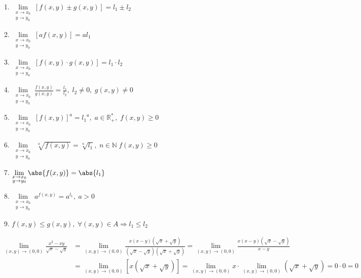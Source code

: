 \documentclass[a4paper,11pt]{report}
\begin{document}
\begin{mybox2}
\begin{thm}
    \begin{minipage}[t]{0.5\textwidth}
      \begin{enumerate}
        \item $ \lim\limits_{\substack{x\to x_{0} \\y \to y_{0}}}  [f(x,y)\pm g(x,y)] = 
          l_{1}\pm l_{2} $ 
        \item $ \lim\limits_{\substack{x\to x_{0} \\y \to y_{0}}}  [a f(x,y)] = al_{1} $
        \item $ \lim\limits_{\substack{x\to x_{0} \\y \to y_{0}}}  [f(x,y)\cdot g(x,y)] = 
          l_{1}\cdot l_{2} $
        \item $ \lim\limits_{\substack{x\to x_{0} \\y \to y_{0}}}  \frac{f(x,y)}{g(x,y)} = 
          \frac{l_{1}}{l_{2}}, \; l_{2} \neq 0, \; g(x,y) \neq 0 $
        \item $ \lim\limits_{\substack{x\to x_{0} \\y \to y_{0}}}  [f(x,y)]^{a} = 
          {l_{1}}^{a}, \; a \in \mathbb{R}^{*}_{+}, \; f(x,y) \geq 0 $
        \item $ \lim\limits_{\substack{x\to x_{0} \\y \to y_{0}}}  \ \sqrt[n]{f(x,y)} =
          \sqrt[n]{l_{1}}, \; n \in \mathbb{N} \; f(x,y) \geq 0  $
      \end{enumerate}
    \end{minipage} \hfill 
    \begin{minipage}[t]{0.49\textwidth}
      \begin{enumerate}
        \setcounter{enumi}{6}
        \item $ \lim\limits_{\substack{x\to x_{0} \\y \to y_{0}}}  \abs{f(x,y)} = 
          \abs{l_{1}} $ 
        \item $ \lim\limits_{\substack{x\to x_{0} \\y \to y_{0}}} a^{f(x,y)} = 
          a^{l_{1}}, \; a >0 $
        \item $ f(x,y) \leq g(x,y), \; \forall (x,y) \in A \Rightarrow l_{1} \leq l_{2} $
      \end{enumerate}
    \end{minipage}
  \end{thm}
\end{mybox2}

\begin{example}
  \begin{align*}
    \lim\limits_{(x,y)\to (0, 0)} \frac{x^{2}-xy}{\sqrt{x} - \sqrt{y}} 
    &= \lim\limits_{(x,y)\to (0, 0)} \frac{x(x-y)(\sqrt{x} + \sqrt{y})}{(\sqrt{x} -
    \sqrt{y} )(\sqrt{x} + \sqrt{y})} = \lim\limits_{(x,y)\to (0, 0)}
    \frac{x(x-y)(\sqrt{x} - \sqrt{y} )}{x-y} \\
    &= \lim\limits_{(x,y)\to (0,0)} [x(\sqrt{x} + \sqrt{y})] = \lim\limits_{(x,y)\to
    (0, 0)} x \cdot \lim\limits_{(x,y)\to (0, 0)} (\sqrt{x} + \sqrt{y}) = 0 \cdot 0 = 0 
  \end{align*}
\end{example}
\end{document}
